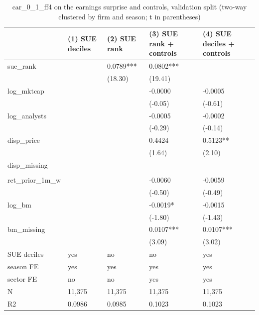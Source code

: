 \begin{table}
\caption{car_0_1_ff4 on the earnings surprise and controls, validation split (two-way clustered by firm and season; t in parentheses)}
\label{tab:cd_surprise_regressions__validation}
\begin{tabular}{lllll}
\toprule
 & (1) SUE deciles & (2) SUE rank & (3) SUE rank + controls & (4) SUE deciles + controls \\
\midrule
sue\_rank &  & 0.0789*** & 0.0802*** &  \\
 &  & (18.30) & (19.41) &  \\
log\_mktcap &  &  & -0.0000 & -0.0005 \\
 &  &  & (-0.05) & (-0.61) \\
log\_analysts &  &  & -0.0005 & -0.0002 \\
 &  &  & (-0.29) & (-0.14) \\
disp\_price &  &  & 0.4424 & 0.5123** \\
 &  &  & (1.64) & (2.10) \\
disp\_missing &  &  &  &  \\
 &  &  &  &  \\
ret\_prior\_1m\_w &  &  & -0.0060 & -0.0059 \\
 &  &  & (-0.50) & (-0.49) \\
log\_bm &  &  & -0.0019* & -0.0015 \\
 &  &  & (-1.80) & (-1.43) \\
bm\_missing &  &  & 0.0107*** & 0.0107*** \\
 &  &  & (3.09) & (3.02) \\
SUE deciles & yes & no & no & yes \\
season FE & yes & yes & yes & yes \\
sector FE & no & no & yes & yes \\
N & 11,375 & 11,375 & 11,375 & 11,375 \\
R2 & 0.0986 & 0.0985 & 0.1023 & 0.1023 \\
\bottomrule
\end{tabular}
\end{table}
